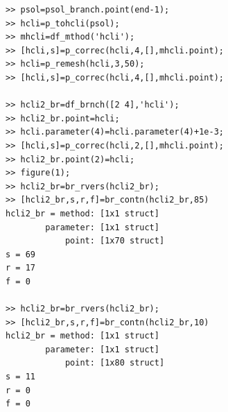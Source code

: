 \documentclass[10pt]{article}
\begin{document}
{{\begin{verbatim}
>> psol=psol_branch.point(end-1);
>> hcli=p_tohcli(psol);
>> mhcli=df_mthod('hcli');
>> [hcli,s]=p_correc(hcli,4,[],mhcli.point);
>> hcli=p_remesh(hcli,3,50);
>> [hcli,s]=p_correc(hcli,4,[],mhcli.point);

>> hcli2_br=df_brnch([2 4],'hcli');
>> hcli2_br.point=hcli;
>> hcli.parameter(4)=hcli.parameter(4)+1e-3;
>> [hcli,s]=p_correc(hcli,2,[],mhcli.point);
>> hcli2_br.point(2)=hcli;
>> figure(1);
>> hcli2_br=br_rvers(hcli2_br);
>> [hcli2_br,s,r,f]=br_contn(hcli2_br,85)
hcli2_br = method: [1x1 struct]
        parameter: [1x1 struct]
            point: [1x70 struct]
s = 69
r = 17
f = 0

>> hcli2_br=br_rvers(hcli2_br);
>> [hcli2_br,s,r,f]=br_contn(hcli2_br,10)
hcli2_br = method: [1x1 struct]
        parameter: [1x1 struct]
            point: [1x80 struct]
s = 11
r = 0
f = 0
\end{verbatim}}

}
\end{document}
